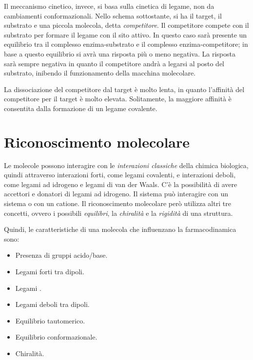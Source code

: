 
Il meccanismo cinetico, invece, si basa sulla cinetica di legame, non da
cambiamenti conformazionali. Nello schema sottostante, si ha il target,
il substrato e una piccola molecola, detta \emph{competitore}. Il
competitore compete con il substrato per formare il legame con il sito
attivo. In questo caso sarà presente un equilibrio tra il complesso
enzima-substrato e il complesso enzima-competitore; in base a questo
equilibrio si avrà una risposta più o meno negativa. La risposta sarà
sempre negativa in quanto il competitore andrà a legarsi al posto del
substrato, inibendo il funzionamento della macchina molecolare.



La dissociazione del competitore dal target è molto lenta, in quanto
l'affinità del competitore per il target è molto elevata. Solitamente,
la maggiore affinità è consentita dalla formazione di un legame
covalente.

\section{Riconoscimento molecolare}

Le molecole possono interagire con le \emph{interazioni classiche} della chimica biologica, quindi attraverso interazioni forti, come legami covalenti, e interazioni deboli, come legami ad idrogeno e legami di van der Waals.
C'è la possibilità di avere accettori e donatori di legami ad idrogeno.
Il sistema \pi{} può interagire con un sistema \pi{} o con un catione.
Il riconoscimento molecolare però utilizza altri tre concetti, ovvero i possibili \emph{equilibri}, la \emph{chiralità} e la \emph{rigidità} di una struttura.

Quindi, le caratteristiche di una molecola che influenzano la farmacodinamica sono:
\begin{itemize}
  \item Presenza di gruppi acido/base.
  \item Legami forti tra dipoli.
  \item Legami \pi.
  \item Legami deboli tra dipoli.
  \item Equilibrio tautomerico.
  \item Equilibrio conformazionale.
  \item Chiralità.
\end{itemize}

